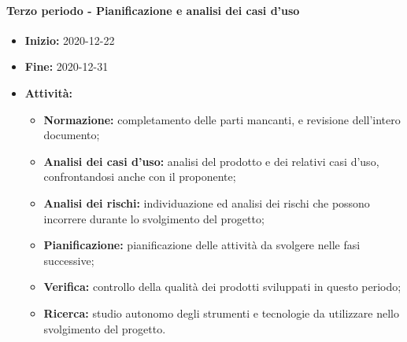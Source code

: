 \paragraph[Terzo periodo]{Terzo periodo - \textnormal{Pianificazione e analisi dei casi d'uso}}
\begin{itemize}
    \item [] \textbf{Inizio:} 2020-12-22
    \item [] \textbf{Fine:} 2020-12-31
    \item [] \textbf{Attività:}
          \begin{itemize}
              \item \textbf{Normazione:} completamento delle parti mancanti, e revisione dell'intero documento;
              \item \textbf{Analisi dei casi d'uso:} analisi del prodotto e dei relativi casi d'uso, confrontandosi anche con il proponente;
              \item \textbf{Analisi dei rischi:} individuazione ed analisi dei rischi che possono incorrere durante lo svolgimento del progetto;
              \item \textbf{Pianificazione:} pianificazione delle attività da svolgere nelle fasi successive;
              \item \textbf{Verifica:} controllo della qualità dei prodotti sviluppati in questo periodo;
              \item \textbf{Ricerca:} studio autonomo degli strumenti e tecnologie da utilizzare nello svolgimento del progetto.
          \end{itemize}
\end{itemize}

